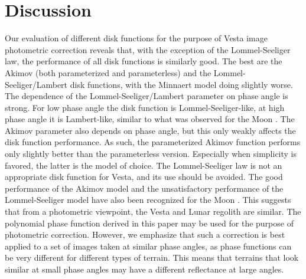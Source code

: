 \documentclass[3p,authoryear]{elsarticle}
\begin{document}
\section{Discussion}
\label{sec:discussion}

Our evaluation of different disk functions for the purpose of Vesta image photometric correction reveals that, with the exception of the Lommel-Seeliger law, the performance of all disk functions is similarly good. The best are the Akimov (both parameterized and parameterless) and the Lommel-Seeliger/Lambert disk functions, with the Minnaert model doing slightly worse. The dependence of the Lommel-Seeliger/Lambert parameter on phase angle is strong. For low phase angle the disk function is Lommel-Seeliger-like, at high phase angle it is Lambert-like, similar to what was observed for the Moon \citep{McE96}. The Akimov parameter also depends on phase angle, but this only weakly affects the disk function performance. As such, the parameterized Akimov function performs only slightly better than the parameterless version. Especially when simplicity is favored, the latter is the model of choice. The Lommel-Seeliger law is not an appropriate disk function for Vesta, and its use should be avoided. The good performance of the Akimov model and the unsatisfactory performance of the Lommel-Seeliger model have also been recognized for the Moon \citep{S12}. This suggests that from a photometric viewpoint, the Vesta and Lunar regolith are similar. The polynomial phase function derived in this paper may be used for the purpose of photometric correction. However, we emphasize that such a correction is best applied to a set of images taken at similar phase angles, as phase functions can be very different for different types of terrain. This means that terrains that look similar at small phase angles may have a different reflectance at large angles.
\end{document}
